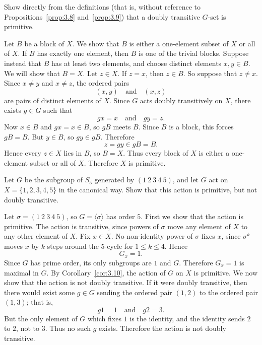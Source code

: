 \documentclass[../Odyssey_Project.tex]{subfiles}
\begin{document}
\begin{exercise}
\label{ex:3.3}
Show directly from the definitions (that is, without reference to Propositions~\ref{prop:3.8} and~\ref{prop:3.9}) that a doubly transitive $G$-set is primitive.
\end{exercise}
\begin{solution}
    Let $B$ be a block of $X$. We show that $B$ is either a one-element subset of $X$ or all of $X$.
    If $B$ has exactly one element, then $B$ is one of the trivial blocks. Suppose instead that $B$ has at least two elements, and choose distinct elements $x,y \in B$. We will show that $B = X$.
    Let $z \in X$. If $z = x$, then $z \in B$. So suppose that $z \neq x$. Since $x \neq y$ and $x \neq z$, the ordered pairs
    \[
        (x,y)
        \quad\text{and}\quad
        (x,z)
    \]
    are pairs of distinct elements of $X$. Since $G$ acts doubly transitively on $X$, there exists $g \in G$ such that
    \[
        gx = x
        \quad\text{and}\quad
        gy = z.
    \]
    Now $x \in B$ and $gx = x \in B$, so $gB$ meets $B$. Since $B$ is a block, this forces $gB = B$. But $y \in B$, so $gy \in gB$. Therefore
    \[
        z = gy \in gB = B.
    \]
    Hence every $z \in X$ lies in $B$, so $B = X$.
    Thus every block of $X$ is either a one-element subset or all of $X$. Therefore $X$ is primitive.
\end{solution}

\begin{exercise}
\label{ex:3.4}
Let $G$ be the subgroup of $S_5$ generated by $(1\ 2\ 3\ 4\ 5)$, and let $G$ act on $X = \{1,2,3,4,5\}$ in the canonical way. Show that this action is primitive, but not doubly transitive.
\end{exercise}
\begin{solution}
    Let $\sigma = (1\ 2\ 3\ 4\ 5)$, so $G = \langle \sigma \rangle$ has order $5$.
    First we show that the action is primitive. The action is transitive, since powers of $\sigma$ move any element of $X$ to any other element of $X$. Fix $x \in X$. No non-identity power of $\sigma$ fixes $x$, since $\sigma^k$ moves $x$ by $k$ steps around the $5$-cycle for $1 \leq k \leq 4$. Hence
    \[
        G_x = 1.
    \]
    Since $G$ has prime order, its only subgroups are $1$ and $G$. Therefore $G_x = 1$ is maximal in $G$. By Corollary~\ref{cor:3.10}, the action of $G$ on $X$ is primitive.
    We now show that the action is not doubly transitive. If it were doubly transitive, then there would exist some $g \in G$ sending the ordered pair $(1,2)$ to the ordered pair $(1,3)$; that is,
    \[
        g1 = 1
        \quad\text{and}\quad
        g2 = 3.
    \]
    But the only element of $G$ which fixes $1$ is the identity, and the identity sends $2$ to $2$, not to $3$. Thus no such $g$ exists. Therefore the action is not doubly transitive.
\end{solution}
\end{document}
